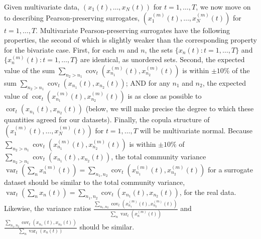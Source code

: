\documentclass[letterpaper,11pt]{article}
\newcommand{\var}{\operatorname{var}}
\newcommand{\cor}{\operatorname{cor}}
\newcommand{\cov}{\operatorname{cov}}
\begin{document}
Given multivariate data, $(x_1(t),\ldots,x_N(t))$ for $t=1,\ldots,T$,
we now move on to describing Pearson-preserving surrogates, 
$(x_1^{(m)}(t),\ldots,x_N^{(m)}(t))$ for $t=1,\ldots,T$. Multivariate Pearson-preserving surrogates 
have the following properties, the second of which is slightly weaker than the 
corresponding property for the bivariate case.
First, for each $m$ and $n$, the sets $\{x_n(t) : t=1,\ldots,T\}$ and 
$\{x_n^{(m)}(t) : t=1,\ldots,T\}$ are identical, as unordered sets. 
Second, the expected value of the sum $\sum_{n_2>n_1} \cov_t(x_{n_1}^{(m)}(t),x_{n_2}^{(m)}(t))$
is within $\pm 10\%$ of the sum $\sum_{n_2>n_1} \cov_t(x_{n_1}(t),x_{n_2}(t))$;
AND for any $n_1$ and $n_2$, the expected value of
$\cor_t(x_{n_1}^{(m)}(t),x_{n_2}^{(m)}(t))$ is as close as possible to
$\cor_t(x_{n_1}(t),x_{n_2}(t))$ (below, we will make precise
the degree to which these quantities agreed for our datasets).
Finally, the copula structure of $(x_1^{(m)}(t),\ldots,x_N^{(m)}(t))$
for $t=1,\ldots,T$ will be multivariate normal. Because
$\sum_{n_2>n_1} \cov_t(x_{n_1}^{(m)}(t),x_{n_2}^{(m)}(t))$
is within $\pm 10\%$ of $\sum_{n_2>n_1} \cov_t(x_{n_1}(t),x_{n_2}(t))$,
the total community variance $\var_t(\sum_n x_n^{(m)}(t))= \sum_{n_1, n_2} \cov_t(x_{n_1}^{(m)}(t),x_{n_2}^{(m)}(t))$
for a surrogate dataset should be similar to the total community variance,
$\var_t(\sum_n x_n(t))= \sum_{n_1, n_2} \cov_t(x_{n_1}(t),x_{n_2}(t))$, for the real data.
Likewise,
the variance ratios $\frac{\sum_{n_1, n_2} \cov_t(x_{n_1}^{(m)}(t),x_{n_2}^{(m)}(t))}
{\sum_{n} \var_t(x_n^{(m)}(t))}$ and 
$\frac{\sum_{n_1, n_2} \cov_t(x_{n_1}(t),x_{n_2}(t))}
{\sum_{n} \var_t(x_n(t))}$ should be similar.
\end{document}
